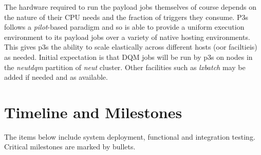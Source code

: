 \documentclass[pdftex,12pt,letter]{article}
\begin{document}
The hardware required to run the payload jobs themselves of course
depends on the nature of their CPU needs and the fraction of triggers
they consume.  P3s follows a \textit{pilot}-based paradigm and so is
able to provide a uniform execution environment to its payload jobs
over a variety of native hosting environments.  This gives p3s the ability
to scale elastically across different hosts (oor faciltieis) as needed.  Initial expectation
is that DQM jobs will be run by p3s on nodes in the \textit{neutdqm}
partition of \textit{neut} cluster.  Other facilities such as
\textit{lxbatch} \cite{lxbatch} may be added if needed and as available.



\section{Timeline and Milestones}
\label{sec:timeline}
The items below include system deployment, functional and integration testing.
Critical milestones are marked by bullets.
\end{document}
